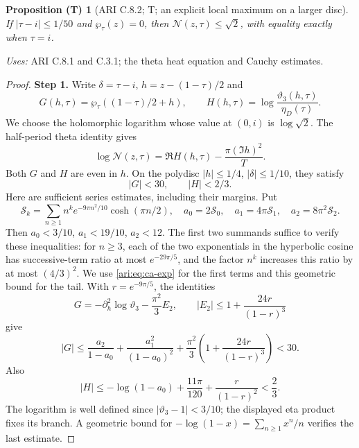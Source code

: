 \documentclass[11pt,a4paper]{article}
\theoremstyle{plain}
\newtheorem{proposition}[theorem]{Proposition (T)}
\theoremstyle{definition}
\begin{document}
\begin{proposition}[ARI C.8.2; T; an explicit local maximum on a larger disc]\label{ari:C.8.2}
If $|\tau-i|\le1/50$ and $\wp_\tau(z)=0$, then
$\mathcal N(z,\tau)\le\sqrt2$, with equality exactly when $\tau=i$.
\end{proposition}
\noindent\textit{Uses:} ARI C.8.1 and C.3.1; the theta heat equation and Cauchy estimates.\par
\begin{proof}
\noindent\textbf{Step 1.} Write $\delta=\tau-i$, $h=z-(1-\tau)/2$ and
\[
 G(h,\tau)=\wp_\tau((1-\tau)/2+h),\qquad
 H(h,\tau)=\log\frac{\vartheta_3(h,\tau)}{\eta_D(\tau)}.
\]
We choose the holomorphic logarithm whose value at $(0,i)$ is
$\log\sqrt2$. The half-period theta identity gives
\begin{equation}\label{ari:eq:ca-H}
 \log \mathcal N(z,\tau)=\Re H(h,\tau)-\frac{\pi(\Im h)^2}{T}.
\end{equation}
Both $G$ and $H$ are even in $h$. On the polydisc
$|h|\le1/4$, $|\delta|\le1/10$, they satisfy
\begin{equation}\label{ari:eq:ca-GHbounds}
 |G|<30,\qquad |H|<2/3.
\end{equation}
Here are sufficient series estimates, including their margins.
Put
\[
 \mathcal S_k=\sum_{n\ge1}n^k e^{-9\pi n^2/10}\cosh(\pi n/2),
 \quad a_0=2\mathcal S_0,\quad a_1=4\pi \mathcal S_1,\quad a_2=8\pi^2\mathcal S_2.
\]
Then $a_0<3/10$, $a_1<19/10$, $a_2<12$.
The first two summands suffice to verify these inequalities: for
$n\ge3$, each of the two exponentials in the hyperbolic cosine
has successive-term ratio at most $e^{-29\pi/5}$, and the
factor $n^k$ increases this ratio by at most $(4/3)^2$.
We use \eqref{ari:eq:ca-exp} for the first terms and this geometric
bound for the tail. With $r=e^{-9\pi/5}$, the identities
\[
 G=-\partial_h^2\log\vartheta_3-\frac{\pi^2}{3}E_2,
 \qquad
 |E_2|\le1+\frac{24r}{(1-r)^3}
\]
give
\[
 |G|\le\frac{a_2}{1-a_0}+\frac{a_1^2}{(1-a_0)^2}
       +\frac{\pi^2}{3}\left(1+\frac{24r}{(1-r)^3}\right)<30.
\]
Also
\[
 |H|\le-\log(1-a_0)+\frac{11\pi}{120}
                    +\frac{r}{(1-r)^2}<\frac23.
\]
The logarithm is well defined since $|\vartheta_3-1|<3/10$;
the displayed eta product fixes its branch. A geometric bound
for $-\log(1-x)=\sum_{n\ge1}x^n/n$ verifies the last estimate.



\end{proof}
\end{document}
